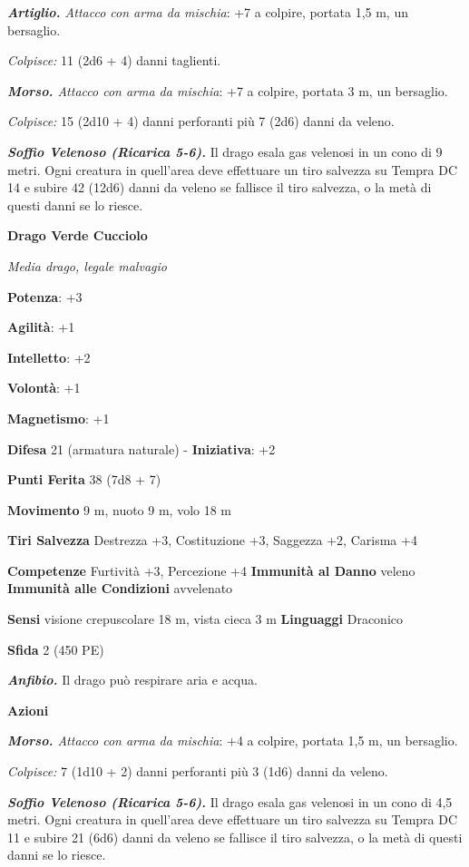 \begin{multicols}{2}
\emph{\textbf{Artiglio.} Attacco con arma da mischia}: +7 a colpire,
portata 1,5 m, un bersaglio.

\emph{Colpisce:} 11 (2d6 + 4) danni taglienti.

\emph{\textbf{Morso.} Attacco con arma da mischia}: +7 a colpire,
portata 3 m, un bersaglio.

\emph{Colpisce:} 15 (2d10 + 4) danni perforanti più 7 (2d6) danni da
veleno.

\emph{\textbf{Soffio Velenoso (Ricarica 5-6).}} Il drago esala gas
velenosi in un cono di 9 metri. Ogni creatura in quell'area deve
effettuare un tiro salvezza su Tempra DC 14 e subire 42 (12d6)
danni da veleno se fallisce il tiro salvezza, o la metà di questi danni
se lo riesce.



\textbf{Drago Verde Cucciolo}

\emph{Media drago, legale malvagio}

\textbf{Potenza}: +3

\textbf{Agilità}: +1

\textbf{Intelletto}: +2

\textbf{Volontà}: +1

\textbf{Magnetismo}: +1

\textbf{Difesa} 21 (armatura naturale) - \textbf{Iniziativa}: +2

\textbf{Punti Ferita} 38 (7d8 + 7)

\textbf{Movimento} 9 m, nuoto 9 m, volo 18 m

\textbf{Tiri Salvezza} Destrezza +3, Costituzione +3, Saggezza +2,
Carisma +4

\textbf{Competenze} Furtività +3, Percezione +4 \textbf{Immunità al Danno}
veleno \textbf{Immunità alle Condizioni} avvelenato

\textbf{Sensi} visione crepuscolare 18 m, vista cieca 3 m
\textbf{Linguaggi} Draconico

\textbf{Sfida} 2 (450 PE)

\emph{\textbf{Anfibio.}} Il drago può respirare aria e acqua.

\textbf{Azioni}

\emph{\textbf{Morso.} Attacco con arma da mischia}: +4 a colpire,
portata 1,5 m, un bersaglio.

\emph{Colpisce:} 7 (1d10 + 2) danni perforanti più 3 (1d6) danni da
veleno.

\emph{\textbf{Soffio Velenoso (Ricarica 5-6).}} Il drago esala gas
velenosi in un cono di 4,5 metri. Ogni creatura in quell'area deve
effettuare un tiro salvezza su Tempra DC 11 e subire 21 (6d6)
danni da veleno se fallisce il tiro salvezza, o la metà di questi danni
se lo riesce.


\end{multicols}

